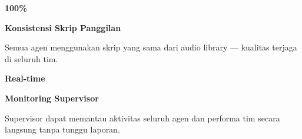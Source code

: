 \documentclass[a4paper]{article}
\begin{document}
\begin{minipage}[t]{0.485\textwidth}
    \noindent\colorbox{BlueBg}{%
        \begin{minipage}[t][2.7cm][c]{\dimexpr\linewidth-2\fboxsep\relax}
            \centering
            {\fontsize{20}{24}\selectfont\bfseries\color{CrimsonPrimary} 100\%}\par\vspace{2pt}
            {\fontsize{9.5}{12}\selectfont\bfseries\color{BlueDark} Konsistensi Skrip Panggilan}\par\vspace{2pt}
            {\fontsize{8.5}{11}\selectfont\color{TextDark}Semua agen menggunakan skrip yang sama dari audio library --- kualitas terjaga di seluruh tim.}
        \end{minipage}}\par
    \vspace{6pt}
    \noindent\colorbox{BlueBg}{%
        \begin{minipage}[t][2.7cm][c]{\dimexpr\linewidth-2\fboxsep\relax}
            \centering
            {\fontsize{20}{24}\selectfont\bfseries\color{CrimsonPrimary} Real-time}\par\vspace{2pt}
            {\fontsize{9.5}{12}\selectfont\bfseries\color{BlueDark} Monitoring Supervisor}\par\vspace{2pt}
            {\fontsize{8.5}{11}\selectfont\color{TextDark}Supervisor dapat memantau aktivitas seluruh agen dan performa tim secara langsung tanpa tunggu laporan.}
        \end{minipage}}%
\end{minipage}

\vspace{8pt}
\end{document}
